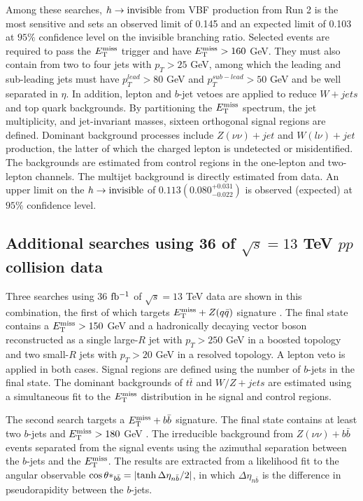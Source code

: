 Among these searches, $h\rightarrow \mathrm{invisible}$ from VBF production from Run 2 is the most sensitive and sets an observed limit of 0.145 and an expected limit of 0.103 at $95\%$ confidence level on the invisible branching ratio. Selected events are required to pass the $E_{\mathrm{T}}^{\mathrm{miss}}$ trigger and have $E_{\mathrm{T}}^{\mathrm{miss}}>160$ GeV. They must also contain from two to four jets with $p_T>25$ GeV, among which the leading and sub-leading jets must have $p_T^{lead}>80$ GeV and $p_T^{sub-lead}>50$ GeV and be well separated in $\eta$. In addition, lepton and $b$-jet vetoes are applied to reduce $W+jets$ and top quark backgrounds. By partitioning the $E_{\mathrm{T}}^{\mathrm{miss}}$ spectrum, the jet multiplicity, and jet-invariant masses, sixteen orthogonal signal regions are defined. Dominant background processes include $Z(\nu\nu)+jet$ and $W(l\nu)+jet$ production, the latter of which the charged lepton is undetected or misidentified. The backgrounds are estimated from control regions in the one-lepton and two-lepton channels. The multijet background is directly estimated from data. An upper limit on the $h\rightarrow \mathrm{invisible}$ of $0.113\left(0.080^{+0.031}_{-0.022} \right)$ is observed (expected) at $95\%$ confidence level. 

\subsection{Additional searches using 36 \texorpdfstring{\ifb}{TEXT} of \texorpdfstring{$\sqrt{s}=13$}{TEXT} TeV \texorpdfstring{$pp$}{TEXT} collision data}

Three searches using 36 $\mbox{fb\(^{-1}\)}$ of $\sqrt{s}=13$ TeV data are shown in this combination, the first of which targets $E_{\mathrm{T}}^{\mathrm{miss}} + Z(q\bar{q})$ signature \cite{EXOT-2016-23}. The final state contains a $E_{\mathrm{T}}^{\mathrm{miss}}>150$ GeV and a hadronically decaying vector boson reconstructed as a single large-$R$ jet with $p_T>250$ GeV in a boosted topology and two small-$R$ jets with $p_T>20$ GeV in a resolved topology. A lepton veto is applied in both cases. Signal regions are defined using the number of $b$-jets in the final state. The dominant backgrounds of $t\bar{t}$ and $W/Z+jets$ are estimated using a simultaneous fit to the $E_{\mathrm{T}}^{\mathrm{miss}}$ distribution in he signal and control regions.

The second search targets a $E_{\mathrm{T}}^{\mathrm{miss}}+b\bar{b}$ signature. The final state contains at least two $b$-jets and $E_{\mathrm{T}}^{\mathrm{miss}}>180$ GeV \cite{SUSY-2016-18}. The irreducible background from $Z(\nu\nu)+b\bar{b}$ events separated from the signal events using the azimuthal separation between the $b$-jets and the $E_{\mathrm{T}}^{\mathrm{miss}}$. The results are extracted from a likelihood fit to the angular observable $\cos\theta*_{b\bar{b}} = \abs{\tanh\Delta\eta_{n\bar{b}}/2}$, in which $\Delta\eta_{n\bar{b}}$ is the difference in pseudorapidity between the $b$-jets.

